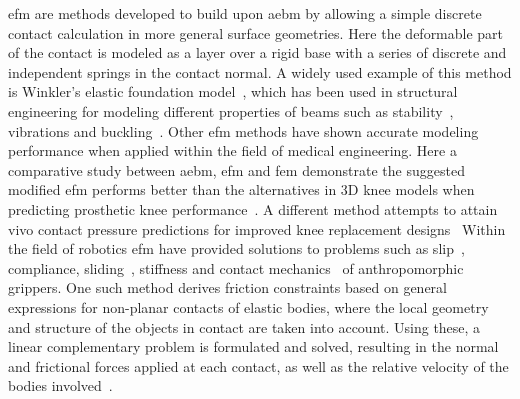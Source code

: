 \gls{efm} are methods developed to build upon \gls{aebm} by allowing a simple discrete contact calculation in more general surface geometries. Here the deformable part of the contact is modeled as a layer over a rigid base with a series of discrete and independent springs in the contact normal. A widely used example of this method is Winkler's elastic foundation model~\cite{kl-johnson-and-contact-mechanics}, which has been used in structural engineering for modeling different properties of beams such as stability~\cite{stability-of-a-timoshenko-beam-resting-on-a-winkler-elastic-foundation}, vibrations and buckling~\cite{vibrations-and-buckling-of-a-beam-on-a-variable-winkler-elastic-foundation}. Other \gls{efm} methods have shown accurate modeling performance when applied within the field of medical engineering. Here a comparative study between \gls{aebm}, \gls{efm} and \gls{fem} demonstrate the suggested modified \gls{efm} performs better than the alternatives in 3D knee models when predicting prosthetic knee performance~\cite{a-modified-elastic-foundation-contact-model-for-application-in-3d-models-of-the-prosthetic-knee}. A different method attempts to attain vivo contact pressure predictions for improved knee replacement designs~\cite{experimental-evaluation-of-an-elastic-foundation-model-to-predict-contact-pressures-in-knee-replacements} Within the field of robotics \gls{efm} have provided solutions to problems such as slip~\cite{the-sliding-of-robot-fingers-under-combined-torsion-and-shear-loading}, compliance, sliding~\cite{quasistatic-manipulation-with-compliance-and-sliding, practical-force-motion-models-for-sliding-manipulation}, stiffness and contact mechanics~\cite{stiffness-and-contact-mechanics-for-soft-fingers-in-grasping-and-manipulation} of anthropomorphic grippers. One such method derives friction constraints based on general expressions for non-planar contacts of elastic bodies, where the local geometry and structure of the objects in contact are taken into account. Using these, a linear complementary problem is formulated and solved, resulting in the normal and frictional forces applied at each contact, as well as the relative velocity of the bodies involved~\cite{soft-finger-model-with-adaptive-contact-geometry-for-grasping-and-manipulation-tasks}. \medskip

